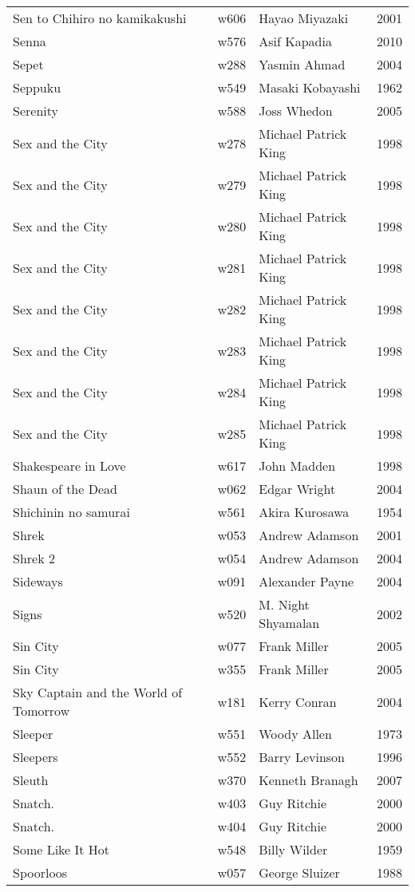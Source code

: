 \documentclass{article}
\begin{document}
\begin {center}
\begin{longtable}{p{10cm} l l l}
Sen to Chihiro no kamikakushi & w606 & Hayao Miyazaki & 2001 \\
Senna & w576 & Asif Kapadia & 2010 \\
Sepet & w288 & Yasmin Ahmad & 2004 \\
Seppuku & w549 & Masaki Kobayashi & 1962 \\
Serenity & w588 & Joss Whedon & 2005 \\
Sex and the City & w278 & Michael Patrick King & 1998 \\
Sex and the City & w279 & Michael Patrick King & 1998 \\
Sex and the City & w280 & Michael Patrick King & 1998 \\
Sex and the City & w281 & Michael Patrick King & 1998 \\
Sex and the City & w282 & Michael Patrick King & 1998 \\
Sex and the City & w283 & Michael Patrick King & 1998 \\
Sex and the City & w284 & Michael Patrick King & 1998 \\
Sex and the City & w285 & Michael Patrick King & 1998 \\
Shakespeare in Love & w617 & John Madden & 1998 \\
Shaun of the Dead & w062 & Edgar Wright & 2004 \\
Shichinin no samurai & w561 & Akira Kurosawa & 1954 \\
Shrek & w053 & Andrew Adamson & 2001 \\
Shrek 2 & w054 & Andrew Adamson & 2004 \\
Sideways & w091 & Alexander Payne & 2004 \\
Signs & w520 & M. Night Shyamalan & 2002 \\
Sin City & w077 & Frank Miller & 2005 \\
Sin City & w355 & Frank Miller & 2005 \\
Sky Captain and the World of Tomorrow & w181 & Kerry Conran & 2004 \\
Sleeper & w551 & Woody Allen & 1973 \\
Sleepers & w552 & Barry Levinson & 1996 \\
Sleuth & w370 & Kenneth Branagh & 2007 \\
Snatch. & w403 & Guy Ritchie & 2000 \\
Snatch. & w404 & Guy Ritchie & 2000 \\
Some Like It Hot & w548 & Billy Wilder & 1959 \\
Spoorloos & w057 & George Sluizer & 1988 \\

\end{longtable}
\end{center}
\end{document}
